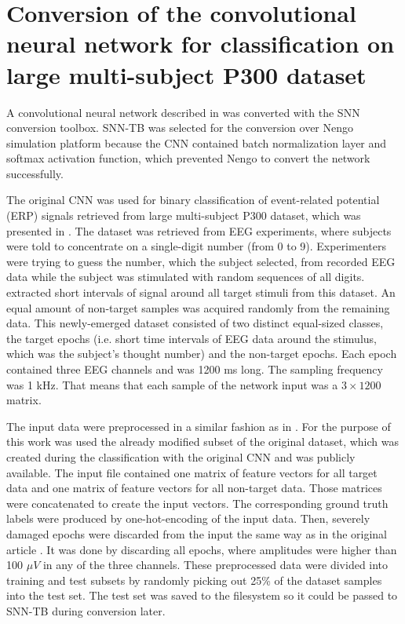 \chapter{Conversion of the convolutional neural network for classification on large multi-subject P300 dataset} \label{chap:06}

A convolutional neural network described in \cite{varekaEvaluationConvolutional20} was converted with the SNN conversion toolbox. SNN-TB was selected for the conversion over Nengo simulation platform because the CNN contained batch normalization layer and softmax activation function, which prevented Nengo to convert the network successfully. \par
The original CNN was used for binary classification of event-related potential (ERP) signals retrieved from large multi-subject P300 dataset, which was presented in \cite{moucekEventrelatedPotential17}. The dataset was retrieved from EEG experiments, where subjects were told to concentrate on a single-digit number (from 0 to 9). Experimenters were trying to guess the number, which the subject selected, from recorded EEG data while the subject was stimulated with random sequences of all digits. \cite{varekaEvaluationConvolutional20} extracted short intervals of signal around all target stimuli from this dataset. An equal amount of non-target samples was acquired randomly from the remaining data. This newly-emerged dataset consisted of two distinct equal-sized classes, the target epochs (i.e. short time intervals of EEG data around the stimulus, which was the subject's thought number) and the non-target epochs. Each epoch contained three EEG channels and was 1200 ms long. The sampling frequency was 1 kHz. That means that each sample of the network input was a $3 \times 1200$ matrix. \par
The input data were preprocessed in a similar fashion as in \cite{varekaEvaluationConvolutional20}. For the purpose of this work was used the already modified subset \cite{moucekReplicationData19} of the original dataset, which was created during the classification with the original CNN and was publicly available. The input file contained one matrix of feature vectors for all target data and one matrix of feature vectors for all non-target data. Those matrices were concatenated to create the input vectors. The corresponding ground truth labels were produced by one-hot-encoding of the input data. Then, severely damaged epochs were discarded from the input the same way as in the original article \cite{varekaEvaluationConvolutional20}. It was done by discarding all epochs, where amplitudes were higher than 100 $\mu V$ in any of the three channels. These preprocessed data were divided into training and test subsets by randomly picking out 25\% of the dataset samples into the test set. The test set was saved to the filesystem so it could be passed to SNN-TB during conversion later. \par
